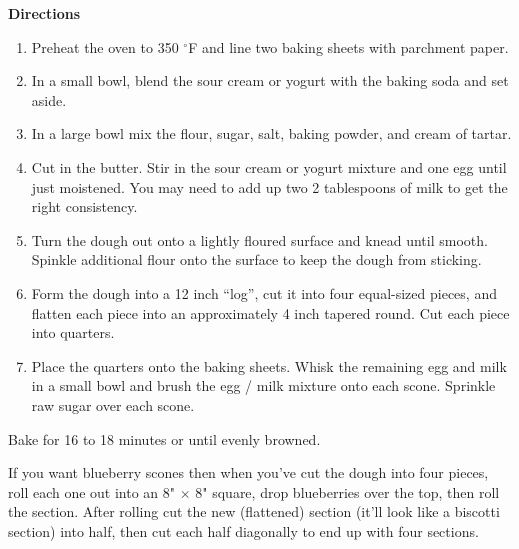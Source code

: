 \documentclass{article}
\begin{document}
\textbf{Directions}

\begin{enumerate}
      \item{Preheat the oven to 350 $^{\circ}$F and line two baking sheets with parchment paper.}
      \item{In a small bowl, blend the sour cream or yogurt with the baking soda and set aside.}
      \item{In a large bowl mix the flour, sugar, salt, baking powder, and cream of tartar.}
      \item{Cut in the butter. Stir in the sour cream or yogurt mixture and one egg until just moistened.
                  You may need to add up two 2 tablespoons of milk to get the right consistency.}
      \item{Turn the dough out onto a lightly floured surface and knead until smooth. Spinkle additional
                  flour onto the surface to keep the dough from sticking.}
      \item{Form the dough into a 12 inch ``log'', cut it into four equal-sized pieces, and flatten
                  each piece into an approximately 4 inch tapered round. Cut each piece into quarters.}
      \item{Place the quarters onto the baking sheets. Whisk the remaining egg and milk in a small bowl
                  and brush the egg / milk mixture onto each scone. Sprinkle raw sugar over each scone.}
\end{enumerate}

\bigskip

Bake for 16 to 18 minutes or until evenly browned.

If you want blueberry scones then when you've cut the dough
into four pieces, roll each one out into an 8" $\times$ 8" square,
drop blueberries over the top, then roll the section. After
rolling cut the new (flattened) section (it'll look like a
biscotti section) into half, then cut each half diagonally
to end up with four sections.

\end{document}
